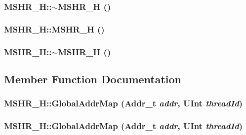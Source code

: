 \hypertarget{classMSHR__H_cbe3ee20d72b496c43ef9f6375f4da1b}{
\subsubsection[{$\sim$MSHR\_\-H}]{\setlength{\rightskip}{0pt plus 5cm}MSHR\_\-H::$\sim$MSHR\_\-H ()}}
\label{classMSHR__H_cbe3ee20d72b496c43ef9f6375f4da1b}


\hypertarget{classMSHR__H_ed75aac9537ffb4d5814b337c1099e82}{
\subsubsection[{MSHR\_\-H}]{\setlength{\rightskip}{0pt plus 5cm}MSHR\_\-H::MSHR\_\-H ()}}
\label{classMSHR__H_ed75aac9537ffb4d5814b337c1099e82}


\hypertarget{classMSHR__H_cbe3ee20d72b496c43ef9f6375f4da1b}{
\subsubsection[{$\sim$MSHR\_\-H}]{\setlength{\rightskip}{0pt plus 5cm}MSHR\_\-H::$\sim$MSHR\_\-H ()}}
\label{classMSHR__H_cbe3ee20d72b496c43ef9f6375f4da1b}




\subsection{Member Function Documentation}
\hypertarget{classMSHR__H_3c9cdbe3938dcfd521f48678b335b839}{
\subsubsection[{GlobalAddrMap}]{ MSHR\_\-H::GlobalAddrMap ({\bf Addr\_\-t} {\em addr}, \/  {\bf UInt} {\em threadId})}}
\label{classMSHR__H_3c9cdbe3938dcfd521f48678b335b839}


\hypertarget{classMSHR__H_3c9cdbe3938dcfd521f48678b335b839}{
\subsubsection[{GlobalAddrMap}]{ MSHR\_\-H::GlobalAddrMap ({\bf Addr\_\-t} {\em addr}, \/  {\bf UInt} {\em threadId})}}
\label{classMSHR__H_3c9cdbe3938dcfd521f48678b335b839}


